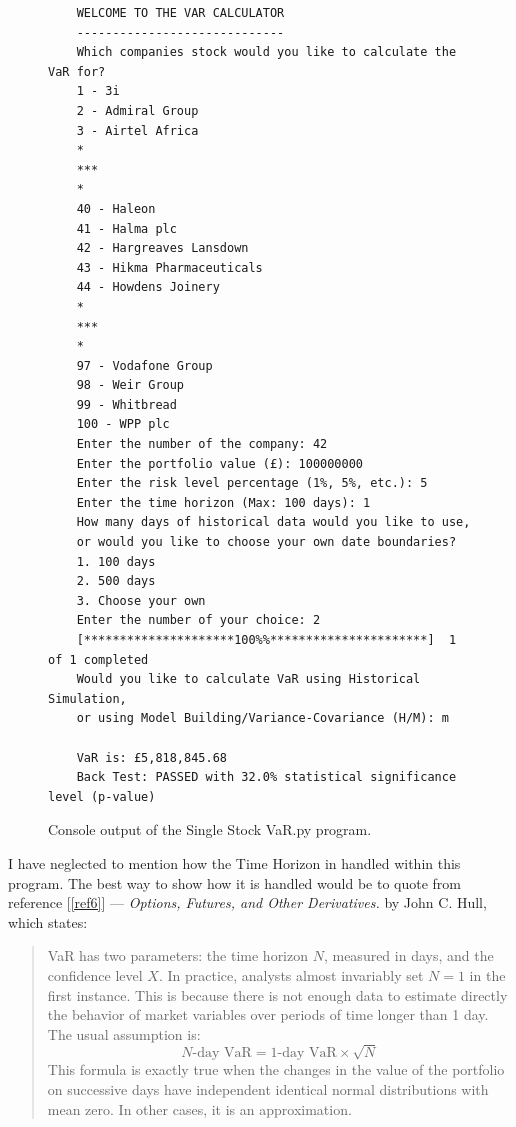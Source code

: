 \documentclass{article}
\begin{document}
\begin{figure}
  \begin{verbatim}
    WELCOME TO THE VAR CALCULATOR
    -----------------------------
    Which companies stock would you like to calculate the VaR for?
    1 - 3i
    2 - Admiral Group
    3 - Airtel Africa
    *
    ***
    *
    40 - Haleon
    41 - Halma plc
    42 - Hargreaves Lansdown
    43 - Hikma Pharmaceuticals
    44 - Howdens Joinery
    *
    ***
    *
    97 - Vodafone Group
    98 - Weir Group
    99 - Whitbread
    100 - WPP plc
    Enter the number of the company: 42
    Enter the portfolio value (£): 100000000
    Enter the risk level percentage (1%, 5%, etc.): 5
    Enter the time horizon (Max: 100 days): 1
    How many days of historical data would you like to use, 
    or would you like to choose your own date boundaries?
    1. 100 days
    2. 500 days
    3. Choose your own
    Enter the number of your choice: 2
    [*********************100%%**********************]  1 of 1 completed
    Would you like to calculate VaR using Historical Simulation, 
    or using Model Building/Variance-Covariance (H/M): m
    
    VaR is: £5,818,845.68
    Back Test: PASSED with 32.0% statistical significance level (p-value)
  \end{verbatim}
  \caption{Console output of the Single Stock VaR.py program.}\label{fig:Single Stock VaR}
\end{figure}

 I have neglected to mention how the Time Horizon in handled within this program. The best way to show how it is handled would be to quote from reference [\ref{ref6}] --- \textit{Options, Futures, and Other Derivatives.} by John C. Hull, which states:

 \begin{quote}
  VaR has two parameters: the time horizon \( N \), measured in days, and the confidence level \( X \). In practice, analysts almost invariably set \( N = 1 \) in the first instance. This is because there is not enough data to estimate directly the behavior of market variables over periods of time longer than 1 day. The usual assumption is: 
  \begin{equation}
    N\text{-day VaR} = \text{1-day VaR} \times \sqrt{N}
    \label{eq:Time Horizon}
  \end{equation}
  This formula is exactly true when the changes in the value of the portfolio on successive days have independent identical normal distributions with mean zero. In other cases, it is an approximation.
\end{quote}
  
\end{document}
